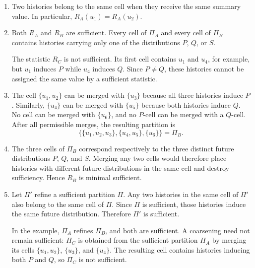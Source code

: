 \documentclass[11pt]{article}
\begin{document}
\begin{solution}[ex:p2-1]
    \begin{enumerate}
      \item Two histories belong to the same cell when they receive
        the same summary value. In particular,
        $R_A(u_1)=R_A(u_2)$.

      \item Both $R_A$ and $R_B$ are sufficient. Every cell of $\Pi_A$ and
        every cell of $\Pi_B$ contains histories carrying only one of the
        distributions $P$, $Q$, or $S$.

        The statistic $R_C$ is not sufficient. Its first cell contains $u_1$
        and $u_4$, for example, but $u_1$ induces $P$ while $u_4$ induces $Q$.
        Since $P\neq Q$, these histories cannot be assigned the same value by
        a sufficient statistic.

      \item The cell $\{u_1,u_2\}$ can be merged with $\{u_3\}$ because all
        three histories induce $P$. Similarly, $\{u_4\}$ can be merged with
        $\{u_5\}$ because both histories induce $Q$. No cell can be merged
        with $\{u_6\}$, and no $P$-cell can be merged with a $Q$-cell. After
        all permissible merges, the resulting partition is
        \[
          \bigl\{\{u_1,u_2,u_3\},\{u_4,u_5\},\{u_6\}\bigr\}=\Pi_B.
        \]

      \item The three cells of $\Pi_B$ correspond respectively to the three
        distinct future distributions $P$, $Q$, and $S$. Merging any two cells
        would therefore place histories with different future distributions
        in the same cell and destroy sufficiency. Hence $R_B$ is minimal
        sufficient.

      \item Let $\Pi'$ refine a sufficient partition $\Pi$. Any two histories
        in the same cell of $\Pi'$ also belong to the same cell of $\Pi$.
        Since $\Pi$ is sufficient, those histories induce the same future
        distribution. Therefore $\Pi'$ is sufficient.

        In the example, $\Pi_A$ refines $\Pi_B$, and both are sufficient. A
        coarsening need not remain sufficient: $\Pi_C$ is obtained from the
        sufficient partition $\Pi_A$ by merging its cells
        $\{u_1,u_2\}$, $\{u_3\}$, and $\{u_4\}$. The resulting cell contains
        histories inducing both $P$ and $Q$, so $\Pi_C$ is not sufficient.


\end{enumerate}
\end{solution}
\end{document}
